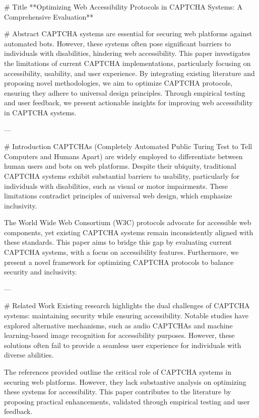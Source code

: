 # Title  
**Optimizing Web Accessibility Protocols in CAPTCHA Systems: A Comprehensive Evaluation**

# Abstract  
CAPTCHA systems are essential for securing web platforms against automated bots. However, these systems often pose significant barriers to individuals with disabilities, hindering web accessibility. This paper investigates the limitations of current CAPTCHA implementations, particularly focusing on accessibility, usability, and user experience. By integrating existing literature and proposing novel methodologies, we aim to optimize CAPTCHA protocols, ensuring they adhere to universal design principles. Through empirical testing and user feedback, we present actionable insights for improving web accessibility in CAPTCHA systems.

---

# Introduction  
CAPTCHAs (Completely Automated Public Turing Test to Tell Computers and Humans Apart) are widely employed to differentiate between human users and bots on web platforms. Despite their ubiquity, traditional CAPTCHA systems exhibit substantial barriers to usability, particularly for individuals with disabilities, such as visual or motor impairments. These limitations contradict principles of universal web design, which emphasize inclusivity.

The World Wide Web Consortium (W3C) protocols advocate for accessible web components, yet existing CAPTCHA systems remain inconsistently aligned with these standards. This paper aims to bridge this gap by evaluating current CAPTCHA systems, with a focus on accessibility features. Furthermore, we present a novel framework for optimizing CAPTCHA protocols to balance security and inclusivity.

---

# Related Work  
Existing research highlights the dual challenges of CAPTCHA systems: maintaining security while ensuring accessibility. Notable studies have explored alternative mechanisms, such as audio CAPTCHAs and machine learning-based image recognition for accessibility purposes. However, these solutions often fail to provide a seamless user experience for individuals with diverse abilities.

The references provided outline the critical role of CAPTCHA systems in securing web platforms. However, they lack substantive analysis on optimizing these systems for accessibility. This paper contributes to the literature by proposing practical enhancements, validated through empirical testing and user feedback.

